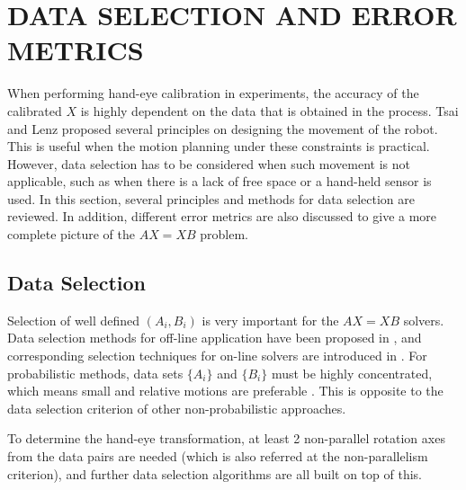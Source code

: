 \documentclass[twocolumn,10pt]{asme2ej}
\begin{document}
\section{DATA SELECTION AND ERROR METRICS}
\label{sec:data_selection}
When performing hand-eye calibration in experiments, the accuracy of the calibrated $X$ is highly dependent on the data that is obtained in the process. Tsai and Lenz \cite{tsai1989new} proposed several principles on designing the movement of the robot. This is useful when the motion planning under these constraints is practical.  However, data selection has to be considered when such movement is not applicable, such as when there is a lack of free space or a hand-held sensor is used. In this section, several principles and methods for data selection are reviewed. In addition, different error metrics are also discussed to give a more complete picture of the $AX=XB$ problem. 
 
\label{qianli-numerical}
\subsection{Data Selection}
Selection of well defined $(A_i,B_i)$ is very important for the $AX=XB$ solvers. Data selection methods for off-line application have been proposed in \cite{vogt2004vector,schmidt2008data,ackermanIROS2013}, and corresponding selection techniques for on-line solvers are introduced in \cite{shi2005approach,zhang2005adaptive}. For probabilistic methods, data sets $\{A_i\}$ and $\{B_i\}$ must be highly concentrated, which means small and relative motions are preferable \cite{ackermanGSI}. This is opposite to the data selection criterion of other non-probabilistic approaches.

To determine the hand-eye transformation, at least 2 non-parallel rotation axes from the data pairs are needed (which is also referred at the non-parallelism criterion), and further data selection algorithms are all built on top of this. 
\end{document}
